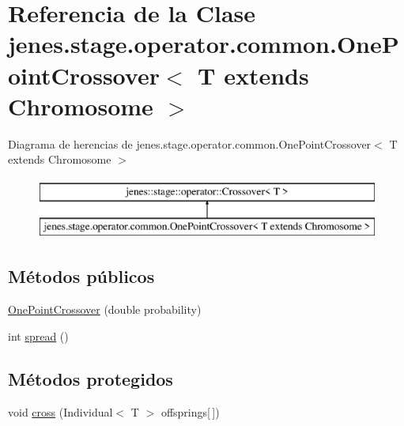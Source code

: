\hypertarget{classjenes_1_1stage_1_1operator_1_1common_1_1_one_point_crossover_3_01_t_01extends_01_chromosome_01_4}{\section{Referencia de la Clase jenes.\-stage.\-operator.\-common.\-One\-Point\-Crossover$<$ T extends Chromosome $>$}
\label{classjenes_1_1stage_1_1operator_1_1common_1_1_one_point_crossover_3_01_t_01extends_01_chromosome_01_4}
}
Diagrama de herencias de jenes.\-stage.\-operator.\-common.\-One\-Point\-Crossover$<$ T extends Chromosome $>$\begin{figure}[H]
\begin{center}
\leavevmode
\includegraphics[height=2.000000cm]{classjenes_1_1stage_1_1operator_1_1common_1_1_one_point_crossover_3_01_t_01extends_01_chromosome_01_4}
\end{center}
\end{figure}
\subsection*{Métodos públicos}
\begin{DoxyCompactItemize}
\item 
\hyperlink{classjenes_1_1stage_1_1operator_1_1common_1_1_one_point_crossover_3_01_t_01extends_01_chromosome_01_4_a441a51f325e76aa282250ecf2c464635}{One\-Point\-Crossover} (double probability)
\item 
int \hyperlink{classjenes_1_1stage_1_1operator_1_1common_1_1_one_point_crossover_3_01_t_01extends_01_chromosome_01_4_a7f29facf7cb0e3baec284ec72730c8c0}{spread} ()
\end{DoxyCompactItemize}
\subsection*{Métodos protegidos}
\begin{DoxyCompactItemize}
\item 
void \hyperlink{classjenes_1_1stage_1_1operator_1_1common_1_1_one_point_crossover_3_01_t_01extends_01_chromosome_01_4_ad8963f25110079a5444d2a0a61d3d1a5}{cross} (Individual$<$ T $>$ offsprings\mbox{[}$\,$\mbox{]})
\end{DoxyCompactItemize}


